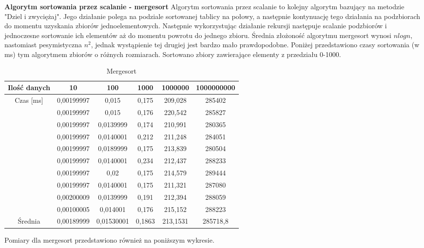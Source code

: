 \documentclass[10pt, a4paper]{article}
\begin{document}
\begin{flushleft}
\newpage
\textbf{Algorytm sortowania przez scalanie - mergesort} \newline \newline
Algorytm sortowania przez scalanie to kolejny algorytm bazujący na metodzie "Dziel i zwyciężaj". Jego działanie polega na podziale sortowanej tablicy na połowy, a następnie kontynuację tego działania na podzbiorach do momentu uzyskania zbiorów jednoelementowych. Następnie wykorzystując działanie rekursji następuje scalanie podzbiorów i jednoczesne sortowanie ich elementów aż do momentu powrotu do jednego zbioru. Średnia złożoność algorytmu mergesort wynosi $nlogn$, nastomiast pesymistyczna $n^2$, jednak wystąpienie tej drugiej jest bardzo mało prawdopodobne. Poniżej przedstawiono czasy sortowania (w ms) tym algorytmem zbiorów o różnych rozmiarach. Sortowano zbiory zawierające elementy z przedziału 0-1000. \newline \newline

\begin{table}[h]
\centering
\caption{Mergesort}
\begin{tabular}{|c|c|c|c|c|c|} \hline
Ilość danych & 10 & 100 & 1000 & 1000000 & 1000000000 \\ \hline
Czas [ms] & 0,00199997 & 0,015 & 0,175 & 209,028 & 285402 \\
& 0,00199997 & 0,015 & 0,176 & 220,542 & 285827 \\
& 0,00199997 & 0,0139999 & 0,174 & 210,991 & 280365 \\
& 0,00199997 & 0,0140001 & 0,212 & 211,248 & 284051 \\
& 0,00199997 & 0,0189999 & 0,175 & 213,839 & 280504 \\
& 0,00199997 & 0,0140001 & 0,234 & 212,437 & 288233 \\
& 0,00199997 & 0,02 & 0,175 & 214,579 & 289444 \\
& 0,00199997 & 0,0140001 & 0,175 & 211,321 & 287080 \\
& 0,00200009 & 0,0139999 & 0,191 & 212,394 & 288059 \\
& 0,00100005 & 0,014001 & 0,176 & 215,152 & 288223 \\ \hline
Średnia & 0,00189999 & 0,01530001 & 0,1863 & 213,1531 & 285718,8 \\ \hline
\end{tabular}
\end{table}

Pomiary dla mergesort przedstawiono również na poniższym wykresie. \newline


\end{flushleft}
\end{document}
